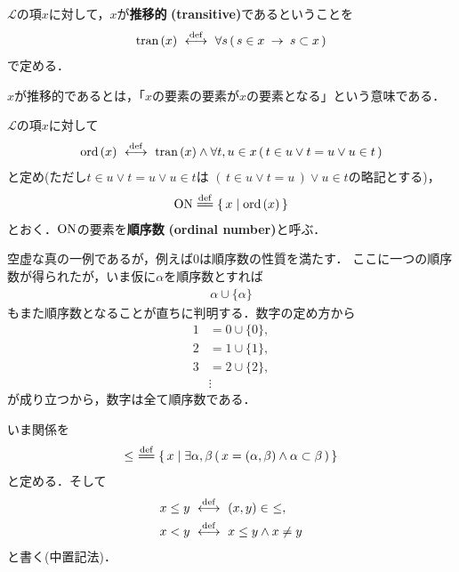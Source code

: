 	\begin{screen}
		\begin{dfn}[推移的類]
			$\mathcal{L}$の項$x$に対して，$x$が{\bf 推移的}
			{\bf (transitive)}であるということを
			\begin{align}
				\operatorname*{tran}\hspace{0.15em}(x) \ \overset{\mathrm{def}}{\longleftrightarrow}\ 
				\forall s\, (\, s \in x \hspace{0.25em}\rightarrow\hspace{0.25em} s \subset x\, )
			\end{align}
			で定める．
		\end{dfn}
	\end{screen}
	
	$x$が推移的であるとは，「$x$の要素の要素が$x$の要素となる」という意味である．
	
	\begin{screen}
		\begin{dfn}[順序数]
			$\mathcal{L}$の項$x$に対して
			\begin{align}
				\operatorname*{ord}\hspace{0.15em}(x) \ \overset{\mathrm{def}}{\longleftrightarrow}\  \operatorname*{tran}\hspace{0.15em}(x) \wedge 
				\forall t,u \in x\, (\, t \in u \vee t = u \vee u \in t\, )
			\end{align}
			と定め(ただし$t \in u \vee t = u \vee u \in t$は
			$(\, t \in u \vee t = u\, ) \vee u \in t$の略記とする)，
			\begin{align}
				\ON \defeq \Set{x}{\ord{x}}
			\end{align}
			とおく．$\mathrm{ON}$の要素を{\bf 順序数}\index{じゅんじょすう@順序数}
			{\bf (ordinal number)}と呼ぶ．
		\end{dfn}
	\end{screen}
	
	空虚な真の一例であるが，例えば$0$は順序数の性質を満たす．
	ここに一つの順序数が得られたが，いま仮に$\alpha$を順序数とすれば
	\begin{align}
		\alpha \cup \{\alpha\}
	\end{align}
	もまた順序数となることが直ちに判明する．数字の定め方から
	\begin{align}
		1 &= 0 \cup \{0\}, \\
		2 &= 1 \cup \{1\}, \\
		3 &= 2 \cup \{2\}, \\
		&\vdots
	\end{align}
	が成り立つから，数字は全て順序数である．
	
	いま関係を
	\begin{align}
		\leq\ \defeq \Set{x}{\exists \alpha,\beta\, 
		(\, x=(\alpha,\beta) \wedge \alpha \subset \beta\, )}
	\end{align}
	と定める．そして
	\begin{align}
		x \leq y &\ \overset{\mathrm{def}}{\longleftrightarrow}\  (x,y) \in\ \leq, \\
		x < y &\ \overset{\mathrm{def}}{\longleftrightarrow}\  x \leq y \wedge x \neq y
	\end{align}
	と書く(中置記法)．
	
